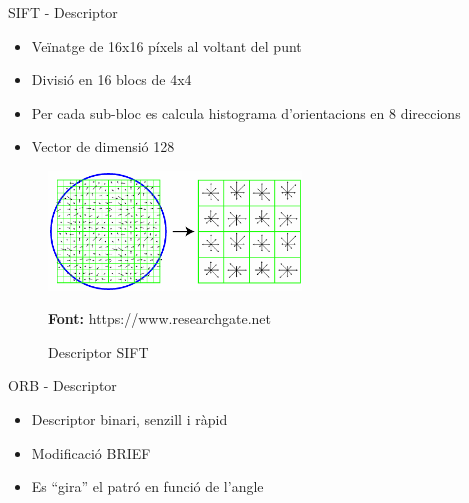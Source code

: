 \documentclass[xcolor=table, 11pt]{beamer}
\newcommand*{\captionsource}[2]{%
  \caption[{#1}]{#1}\par
  \vspace{-0.4cm}
  \tiny{\textbf{Font:} #2\par}}
\newcommand\tz{\fontsize{13}{15.6}\selectfont}
\begin{document}
	\begin{frame}{SIFT - Descriptor}
		\tz
		\begin{itemize}
			\item Veïnatge de 16x16 píxels al voltant del punt
			\item Divisió en 16 blocs de 4x4
			\item Per cada sub-bloc es calcula histograma d'orientacions en 8 direccions
			\item Vector de dimensió 128
		\end{itemize}
		\begin{figure}[H]
			\centering
			\includegraphics[width=0.6\textwidth]{images/sift-des}
			\captionsource{Descriptor SIFT}{https://www.researchgate.net}
		\end{figure}
	\end{frame}

	\begin{frame}{ORB - Descriptor}
		\tz
		\begin{itemize}
			\item Descriptor binari, senzill i ràpid
			\item Modificació BRIEF\cite{Calonder:2010:BBR:1888089.1888148}
			\item Es ``gira'' el patró en funció de l'angle
		\end{itemize}
	\end{frame}
\end{document}
